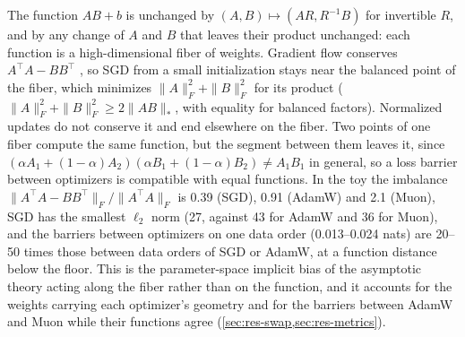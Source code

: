 \documentclass[10pt]{article}
\makeatletter
\renewcommand\paragraph{\@startsection{paragraph}{4}{\z@}{1.2ex \@plus .4ex \@minus .2ex}{-1em}{\normalfont\normalsize\bfseries}}
\makeatother
\begin{document}
\paragraph{Weight space.} The function $AB+b$ is unchanged by $(A,B)\mapsto(AR,R^{-1}B)$ for invertible $R$, and
by any change of $A$ and $B$ that leaves their product unchanged: each function is a high-dimensional fiber of
weights. Gradient flow conserves $A^\top A-BB^\top$ \citep{du2018balanced}, so SGD from a small initialization
stays near the balanced point of the fiber, which minimizes $\|A\|_F^2+\|B\|_F^2$ for its product
($\|A\|_F^2+\|B\|_F^2\ge2\|AB\|_*$, with equality for balanced factors). Normalized updates do not conserve it
and end elsewhere on the fiber. Two points of one fiber compute the same function, but the segment between them
leaves it, since $(\alpha A_1+(1-\alpha)A_2)(\alpha B_1+(1-\alpha)B_2)\ne A_1B_1$ in general, so a loss barrier
between optimizers is compatible with equal functions. In the toy the imbalance $\|A^\top A-BB^\top\|_F/\|A^\top
A\|_F$ is 0.39 (SGD), 0.91 (AdamW) and 2.1 (Muon), SGD has the smallest $\ell_2$ norm (27, against 43 for AdamW
and 36 for Muon), and the barriers between optimizers on one data order (0.013--0.024 nats) are 20--50 times
those between data orders of SGD or AdamW, at a function distance below the floor. This is the parameter-space
implicit bias of the asymptotic theory acting along the fiber rather than on the function, and it accounts for
the weights carrying each optimizer's geometry and for the barriers between AdamW and Muon while their functions
agree (\cref{sec:res-swap,sec:res-metrics}).
\end{document}
